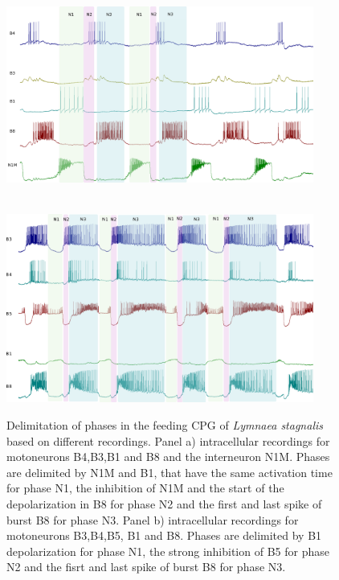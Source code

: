 \begin{figure}[bth!]
	\centering
	\begin{minipage}[b]{0.85\textwidth}
		\\
		\centering
		\includegraphics[width=0.9\textwidth]{img/invariants/example_phases_1.pdf}
	\end{minipage}
	\vspace{20pt}
	\begin{minipage}[b]{0.85\textwidth}
		\\
		\centering
		\includegraphics[width=0.9\textwidth]{img/invariants/example_phases_2.pdf}
	\end{minipage}
	\caption{Delimitation of phases in the feeding CPG of \textit{Lymnaea stagnalis} based on different recordings. Panel a) intracellular recordings for motoneurons B4,B3,B1 and B8 and the interneuron N1M. Phases are delimited by N1M and B1, that have the same activation time for phase N1, the inhibition of N1M and the start of the depolarization in B8 for phase N2 and the first and last spike of burst B8 for phase N3. Panel b) intracellular recordings for motoneurons B3,B4,B5, B1 and B8. Phases are delimited by B1 depolarization for phase N1, the strong inhibition of B5 for phase N2 and the fisrt and last spike of burst B8 for phase N3.}
	\label{fig:example lymnaea phases recording}
\end{figure}

